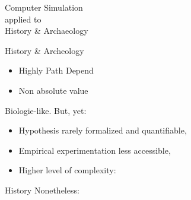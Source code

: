 \documentclass[12pt, notes=show,handout=no]{beamer}
\begin{document}
%

\begin{frame}
    \begin{center}
	\Huge
	Computer Simulation \\ applied to\\  History \& Archaeology
    \end{center}
\end{frame}


\begin{frame}{History \& Archeology}

    \begin{itemize}
	\item <3-> Highly Path Depend
	\item <4-> Non absolute value
    \end{itemize}
    
    Biologie-like. But, yet:
    \begin{itemize}
	\item<5-> Hypothesis rarely formalized and quantifiable, 
	\item<6-> Empirical experimentation less accessible,
	\item<7-> Higher level of complexity:
    \end{itemize}
\end{frame}

\begin{frame}{History}
    Nonetheless:
\end{frame}
\end{document}
